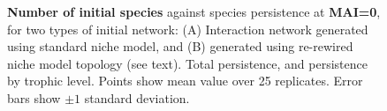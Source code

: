 \begin{figure}
	\centering	
	\setlength{\subfloatlabelskip}{0pt}
	\caption{\textbf{Number of initial species} against species persistence at \textbf{MAI=0}, for two types of initial network: (A) Interaction network generated using standard niche model, and (B) generated using re-rewired niche model topology (see text). Total persistence, and persistence by trophic level. Points show mean value over 25 replicates. Error bars show $\pm 1$ standard deviation.}
	\label{fig:nsp_v_comp_mai00}
\end{figure}
